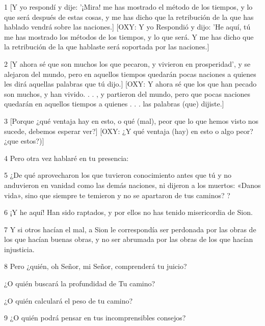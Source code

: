 \par 1 [Y yo respondí y dije: '¡Mira! me has mostrado el método de los tiempos, y lo que será después de estas cosas, y me has dicho que la retribución de la que has hablado vendrá sobre las naciones.] [OXY: Y yo Respondió y dijo: 'He aquí, tú me has mostrado los métodos de los tiempos, y lo que será. Y me has dicho que la retribución de la que hablaste será soportada por las naciones.]

\par 2 [Y ahora sé que son muchos los que pecaron, y vivieron en prosperidad', y se alejaron del mundo, pero en aquellos tiempos quedarán pocas naciones a quienes les dirá aquellas palabras que tú dijo.] [OXY: Y ahora sé que los que han pecado son muchos, y han vivido. . . , y partieron del mundo, pero que pocas naciones quedarán en aquellos tiempos a quienes . . . las palabras (que) dijiste.]

\par 3 [Porque ¿qué ventaja hay en esto, o qué (mal), peor que lo que hemos visto nos sucede, debemos esperar ver?] [OXY: ¿Y qué ventaja (hay) en esto o algo peor? ¿que estos?)]

\par 4 Pero otra vez hablaré en tu presencia:

\par 5 ¿De qué aprovecharon los que tuvieron conocimiento antes que tú y no anduvieron en vanidad como las demás naciones, ni dijeron a los muertos: «Danos vida», sino que siempre te temieron y no se apartaron de tus caminos? ?

\par 6 ¡Y he aquí! Han sido raptados, y por ellos no has tenido misericordia de Sion.

\par 7 Y si otros hacían el mal, a Sion le correspondía ser perdonada por las obras de los que hacían buenas obras, y no ser abrumada por las obras de los que hacían injusticia.

\par 8 Pero ¿quién, oh Señor, mi Señor, comprenderá tu juicio?

\par ¿O quién buscará la profundidad de Tu camino?

\par ¿O quién calculará el peso de tu camino?

\par 9 ¿O quién podrá pensar en tus incomprensibles consejos?

